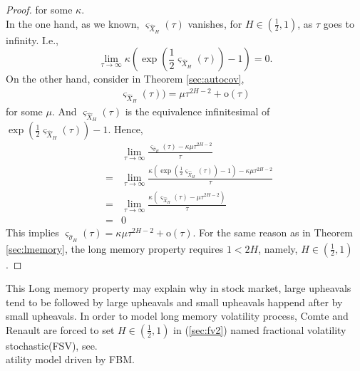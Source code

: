 \documentclass[a4paper, twoside, 11pt]{article}
\theoremstyle{definition}
\begin{document}
\begin{proof}
 for some $\kappa$.\\
 In the one hand, as we known, $\varsigma_{\hat{X}_{H}}(\tau)$ vanishes, for $H\in(\frac{1}{2}, 1)$, as $\tau$ goes to infinity. I.e.,
 $$
 \lim\limits_{\tau\rightarrow \infty}\kappa(\exp(\frac{1}{2}\varsigma_{\hat{X}_{H}}(\tau)) - 1) = 0.
 $$
 On the other hand, consider in Theorem \ref{sec:autocov},
\begin{eqnarray*}
  \varsigma_{\hat{X}_{H}}(\tau)) = \mu \tau^{2H-2} + \mathrm{o}(\tau)
\end{eqnarray*}
for some $\mu$.
And $\varsigma_{\hat{X}_{H}}(\tau)$ is the equivalence infinitesimal of $\exp(\frac{1}{2}\varsigma_{\hat{X}_{H}}(\tau)) - 1$. Hence,
\begin{eqnarray*}
  &&  \lim\limits_{\tau\rightarrow \infty} \frac{\varsigma_{\hat{\sigma}_H}(\tau) - \kappa \mu \tau^{2H-2}}{\tau}\\
  &=& \lim\limits_{\tau\rightarrow \infty}\frac{\kappa(\exp(\frac{1}{2}\varsigma_{\hat{X}_{H}}(\tau)) - 1) - \kappa \mu \tau^{2H-2}}{\tau}\\
  &=& \lim\limits_{\tau\rightarrow \infty}\frac{\kappa(\varsigma_{\hat{X}_{H}}(\tau) - \mu\tau^{2H-2})}{\tau}\\
  &=& 0
\end{eqnarray*}
This implies $\varsigma_{\hat{\sigma}_H}(\tau) = \kappa\mu \tau^{2H-2} + \mathrm{o}(\tau)$. For the same reason as in Theorem \ref{sec:lmemory}, the long memory property requires $1<2H$, namely, $H\in(\frac{1}{2}, 1)$.
\end{proof}

This Long memory property may explain why in stock market, large upheavals tend to be followed by large upheavals and small upheavals happend after by small upheavals.  In order to model long memory volatility process, Comte and Renault are forced to set $H\in (\frac{1}{2}, 1)$ in (\ref{sec:fv2}) named fractional volatility stochastic(FSV), see\cite{comren}. \\
atility model driven by FBM. 
\end{document}
